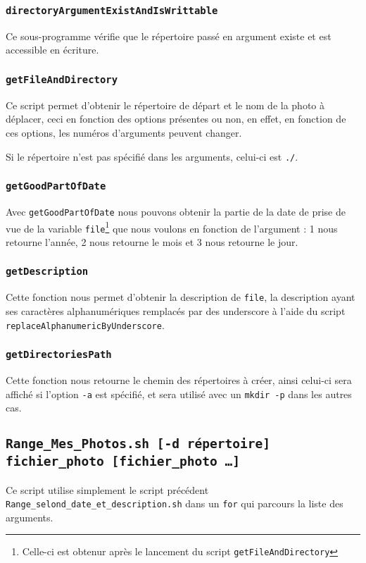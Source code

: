 \documentclass[a4paper, 11pt]{article}
\begin{document}
	\subsubsection{\texttt{directoryArgumentExistAndIsWrittable}}
	Ce sous-programme vérifie que le répertoire passé en argument existe et est accessible en écriture.
	\subsubsection{\texttt{getFileAndDirectory}}
	Ce script permet d'obtenir le répertoire de départ et le nom de la photo à déplacer, ceci en fonction des options présentes ou non, en effet, en fonction de
	ces options, les numéros d'arguments peuvent changer.
	
	Si le répertoire n'est pas spécifié dans les arguments, celui-ci est \texttt{./}.
	\subsubsection{\texttt{getGoodPartOfDate}}
	Avec \texttt{getGoodPartOfDate} nous pouvons obtenir la partie de la date de prise de vue de la variable \texttt{file}\footnote{Celle-ci est obtenur après le
	lancement du script \texttt{getFileAndDirectory}} que nous voulons en fonction de l'argument : 1 nous retourne l'année, 2 nous
	retourne le mois et 3 nous retourne le jour.
	\subsubsection{\texttt{getDescription}}
	Cette fonction nous permet d'obtenir la description de \texttt{file}, la description ayant ses caractères alphanumériques remplacés par des underscore à
	l'aide du script \texttt{replaceAlphanumericByUnderscore}.
	\subsubsection{\texttt{getDirectoriesPath}}
	Cette fonction nous retourne le chemin des répertoires à créer, ainsi celui-ci sera affiché si l'option \texttt{-a} est spécifié, et sera utilisé avec un
	\texttt{mkdir -p} dans les autres cas.
	

	
	\subsection{\texttt{Range\_Mes\_Photos.sh [-d répertoire] fichier\_photo [fichier\_photo \ldots]}}
	Ce script utilise simplement le script précédent \texttt{Range\_selond\_date\_et\_description.sh} dans un \texttt{for} qui parcours la liste des arguments.
	
\end{document}
